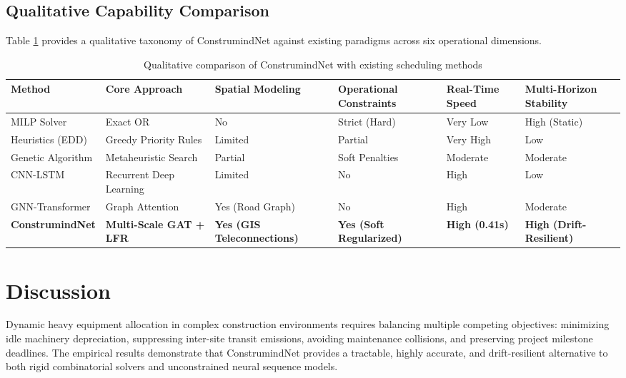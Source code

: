 \documentclass[pdflatex,sn-mathphys,Numbered]{sn-jnl}%
\begin{document}
\subsection{Qualitative Capability Comparison}
Table \ref{tab12} provides a qualitative taxonomy of ConstrumindNet against existing paradigms across six operational dimensions.

\begin{table}[t]
\caption{Qualitative comparison of ConstrumindNet with existing scheduling methods}\label{tab12}
\begin{tabular*}{\textwidth}{@{\extracolsep\fill}llllll@{\extracolsep\fill}}
\toprule
Method & Core Approach & Spatial Modeling & Operational Constraints & Real-Time Speed & Multi-Horizon Stability \\
\midrule
MILP Solver \cite{hossain2025} & Exact OR & No & Strict (Hard) & Very Low & High (Static) \\
Heuristics (EDD) \cite{ejiyi2025} & Greedy Priority Rules & Limited & Partial & Very High & Low \\
Genetic Algorithm \cite{nguyen2024} & Metaheuristic Search & Partial & Soft Penalties & Moderate & Moderate \\
CNN-LSTM \cite{inam2024} & Recurrent Deep Learning & Limited & No & High & Low \\
GNN-Transformer \cite{liu2025} & Graph Attention & Yes (Road Graph) & No & High & Moderate \\
\textbf{ConstrumindNet} & \textbf{Multi-Scale GAT + LFR} & \textbf{Yes (GIS Teleconnections)} & \textbf{Yes (Soft Regularized)} & \textbf{High (0.41s)} & \textbf{High (Drift-Resilient)} \\
\bottomrule
\end{tabular*}
\end{table}

\section{Discussion}\label{sec6}
Dynamic heavy equipment allocation in complex construction environments requires balancing multiple competing objectives: minimizing idle machinery depreciation, suppressing inter-site transit emissions, avoiding maintenance collisions, and preserving project milestone deadlines. The empirical results demonstrate that ConstrumindNet provides a tractable, highly accurate, and drift-resilient alternative to both rigid combinatorial solvers and unconstrained neural sequence models. 
\end{document}
